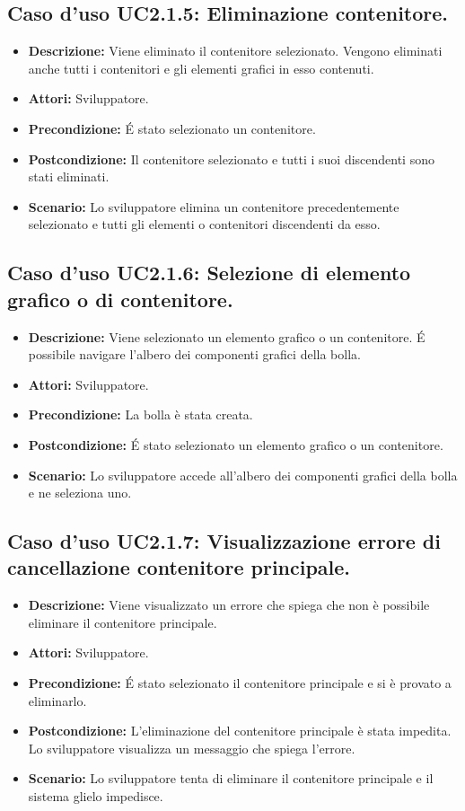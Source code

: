 \subsection{Caso d'uso UC2.1.5: Eliminazione contenitore.}
\begin{itemize}
\item[]\textbf{Descrizione:} Viene eliminato il contenitore selezionato. Vengono eliminati anche tutti i contenitori e gli elementi grafici in esso contenuti.
\item[]\textbf{Attori:} Sviluppatore. 
\item[]\textbf{Precondizione:} \'E stato selezionato un contenitore. 
\item[]\textbf{Postcondizione:} Il contenitore selezionato e tutti i suoi discendenti sono stati eliminati. 
\item[]\textbf{Scenario:}
Lo sviluppatore elimina un contenitore precedentemente selezionato e tutti gli elementi o contenitori discendenti da esso. 
\end{itemize}

\subsection{Caso d'uso UC2.1.6: Selezione di elemento grafico o di contenitore.}
\begin{itemize}
\item[]\textbf{Descrizione:} Viene selezionato un elemento grafico o un contenitore. \'E possibile navigare l'albero dei componenti grafici della bolla.
\item[]\textbf{Attori:} Sviluppatore. 
\item[]\textbf{Precondizione:} La bolla è stata creata. 
\item[]\textbf{Postcondizione:} \'E stato selezionato un elemento grafico o un contenitore. 
\item[]\textbf{Scenario:}
Lo sviluppatore accede all'albero dei componenti grafici della bolla e ne seleziona uno. 
\end{itemize}

\subsection{Caso d'uso UC2.1.7: Visualizzazione errore di cancellazione contenitore principale.}
\begin{itemize}
\item[]\textbf{Descrizione:} Viene visualizzato un errore che spiega che non è possibile eliminare il contenitore principale.
\item[]\textbf{Attori:} Sviluppatore. 
\item[]\textbf{Precondizione:} \'E stato selezionato il contenitore principale e si è provato a eliminarlo. 
\item[]\textbf{Postcondizione:} L'eliminazione del contenitore principale è stata impedita. Lo sviluppatore visualizza un messaggio che spiega l'errore. 
\item[]\textbf{Scenario:}
Lo sviluppatore tenta di eliminare il contenitore principale e il sistema glielo impedisce. 
\end{itemize}

